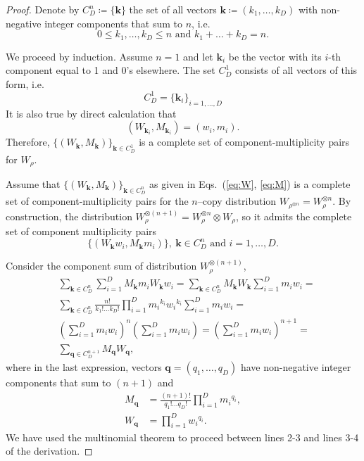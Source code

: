 \documentclass[
twocolumn,
superscriptaddress
]{revtex4-1}
\def\q{\boldsymbol{q}}
\def\k{\boldsymbol{k}}
\def\q{\boldsymbol{q}}
\begin{document}
\begin{proof}
	Denote by $C_D^n \coloneqq \{\k\}$ the set of all vectors $\k \coloneqq (k_1, \dots, k_D)$ with non-negative integer components that sum to $n$, i.e.
	\begin{equation*}
	0 \leq k_1, \dots, k_D \leq n \text{ and } k_1 + \dots + k_D = n.
	\end{equation*}
	
	We proceed by induction.	
	Assume $n = 1$ and let $\k_i$ be the vector with its $i$-th component equal to 1 and 0's elsewhere.
	The set $C_D^1$ consists of all vectors of this form, i.e. 
\begin{equation*}
	C_D^1 = \{ \k_i \}_{i=1,\dots,D}
\end{equation*}
	It is also true by direct calculation that
\begin{equation*}
	\left( W_{\k_i}, M_{\k_i} \right) = (w_i, m_i).
\end{equation*}
Therefore, $\{ (W_{\k}, M_{\k}) \}_{\k \in C_D^1}$ is a complete set of component-multiplicity pairs for $W_\rho$.

	Assume that $\{(W_{\k}, M_{\k})\}_{\k \in C_D^n}$ as given in Eqs.~(\ref{eq:W}, \ref{eq:M}) is a complete set of component-multiplicity pairs for the $n$--copy distribution $W_{\rho^{\otimes n}} = W_{\rho}^{\otimes n}$.
	By construction, the distribution $W_{\rho}^{\otimes (n+1)} = W_{\rho}^{\otimes n} \otimes W_{\rho}$, so it admits the complete set of component multiplicity pairs
\begin{equation}
	\{(W_{\k} w_i, M_{\k} m_i)\},\ \k \in C_D^n \text{ and } i=1,\dots,D.
\end{equation}
	
	Consider the component sum of distribution $W_{\rho}^{\otimes (n+1)}$,
\begin{align*}
	&\sum_{\k \in C_D^n}\sum_{i=1}^D M_{\k} m_i W_{\k} w_i = \sum_{\k \in C_D^n} M_{\k}W_{\k} \sum_{i=1}^D m_i w_i =\\
	&\sum_{\k \in C_D^n} \frac{n!}{k_1!\dots k_D!} \prod\limits_{i=1}^D {m_i}^{k_i}{w_i}^{k_i} \sum_{i=1}^D m_i w_i =\\
	&\left( \sum_{i=1}^D m_i w_i \right)^n \left( \sum_{i=1}^D m_i w_i \right) = \left( \sum_{i=1}^D m_i w_i \right)^{n+1} =\\
	&\sum_{\q \in C_D^{n+1}} M_{\q}W_{\q},
\end{align*}
where in the last expression, vectors $\q = (q_1, \dots, q_D)$ have non-negative integer components that sum to $(n+1)$ and 
\begin{align*}
	M_{\q} &= \frac{(n+1)!}{q_1!\dots q_D!} \prod\limits_{i=1}^D {m_i}^{q_i},\\
	W_{\q} &= \prod\limits_{i=1}^D {w_i}^{q_i}.
\end{align*}
We have used the multinomial theorem to proceed between lines 2-3 and lines 3-4 of the derivation.


\end{proof}
\end{document}
